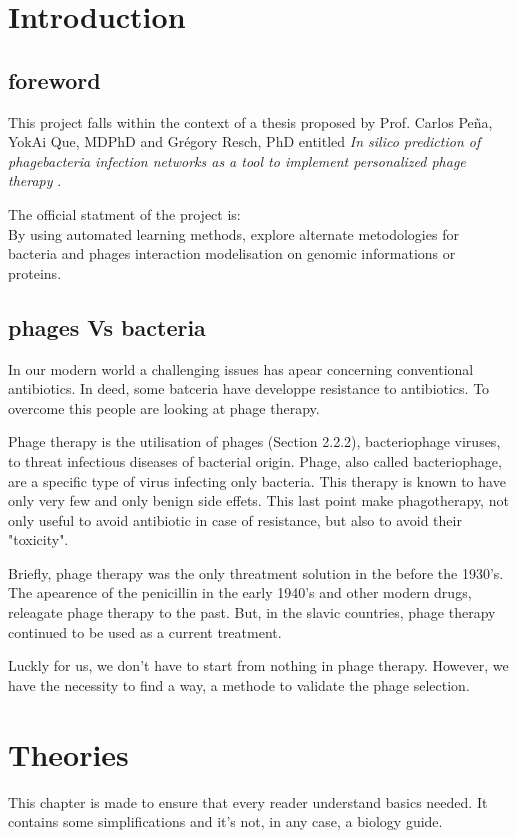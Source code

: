 \documentclass[a4paper,11pt]{report}
\begin{document}
\tableofcontents


\chapter{Introduction}
\section{foreword}
This project falls within the context of a thesis proposed by Prof. Carlos Peña, YokAi
Que, MDPhD and Grégory Resch, PhD entitled \textit{In silico prediction of phagebacteria
infection networks as a tool to implement personalized phage therapy} \cite{ref1}.

The official statment of the project is:\\
By using automated learning methods, explore alternate metodologies for bacteria and phages interaction modelisation on genomic informations or proteins.


\section{phages Vs bacteria}
In our modern world a challenging issues has apear concerning conventional antibiotics. In deed, some batceria have developpe resistance to antibiotics. To overcome this people are looking at phage therapy. 

Phage therapy is the utilisation of phages (Section 2.2.2), bacteriophage viruses, to threat infectious diseases of bacterial origin. Phage, also called bacteriophage, are a specific type of virus infecting only bacteria. This therapy is known to have only very few and only benign side effets. This last point make phagotherapy, not only useful to avoid antibiotic in case of resistance, but also to avoid their "toxicity".

Briefly, phage therapy was the only threatment solution in the before the 1930's. The apearence of the penicillin in the early 1940's and other modern drugs, releagate phage therapy to the past. But, in the slavic countries, phage therapy continued to be used as a current treatment.

Luckly for us, we don't have to start from nothing in phage therapy. However, we have the necessity to find a way, a methode to validate the phage selection. \cite{ref2}


\chapter{Theories}
This chapter is made to ensure that every reader understand basics needed. It contains some simplifications and it's not, in any case, a biology guide.
\end{document}
